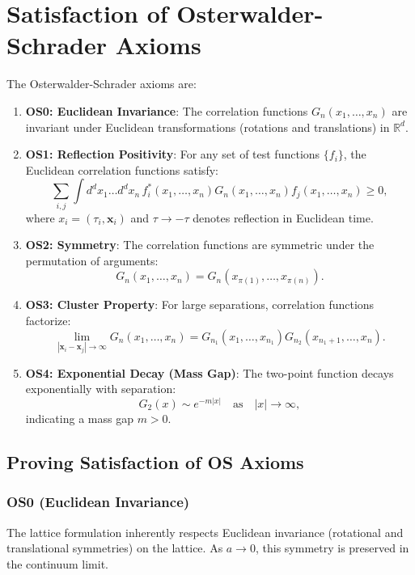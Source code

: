 \section{Satisfaction of Osterwalder-Schrader Axioms}

The Osterwalder-Schrader axioms are:

\begin{enumerate}
    \item \textbf{OS0: Euclidean Invariance}: The correlation functions \(G_n(x_1, \ldots, x_n)\) are invariant under Euclidean transformations (rotations and translations) in \(\mathbb{R}^d\).
    
    \item \textbf{OS1: Reflection Positivity}: For any set of test functions \(\{f_i\}\), the Euclidean correlation functions satisfy:
    \[
    \sum_{i,j} \int d^dx_1 \ldots d^dx_n \, f_i^*(x_1, \ldots, x_n) G_n(x_1, \ldots, x_n) f_j(x_1, \ldots, x_n) \geq 0,
    \]
    where \(x_i = (\tau_i, \mathbf{x}_i)\) and \(\tau \to -\tau\) denotes reflection in Euclidean time.
    
    \item \textbf{OS2: Symmetry}: The correlation functions are symmetric under the permutation of arguments:
    \[
    G_n(x_1, \ldots, x_n) = G_n(x_{\pi(1)}, \ldots, x_{\pi(n)}).
    \]
    
    \item \textbf{OS3: Cluster Property}: For large separations, correlation functions factorize:
    \[
    \lim_{|\mathbf{x}_i - \mathbf{x}_j| \to \infty} G_n(x_1, \ldots, x_n) = G_{n_1}(x_1, \ldots, x_{n_1}) G_{n_2}(x_{n_1+1}, \ldots, x_n).
    \]
    
    \item \textbf{OS4: Exponential Decay (Mass Gap)}: The two-point function decays exponentially with separation:
    \[
    G_2(x) \sim e^{-m|x|} \quad \text{as} \quad |x| \to \infty,
    \]
    indicating a mass gap \(m > 0\).
\end{enumerate}

\subsection{Proving Satisfaction of OS Axioms}

\subsubsection*{OS0 (Euclidean Invariance)} 

The lattice formulation inherently respects Euclidean invariance (rotational and translational symmetries) on the lattice. As \(a \to 0\), this symmetry is preserved in the continuum limit.

